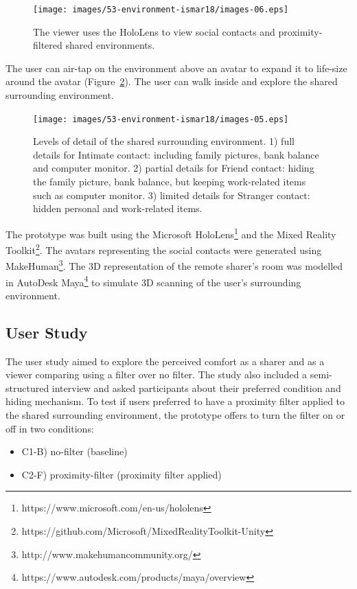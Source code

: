 \begin{figure}
    \centering
    \texttt{[image: images/53-environment-ismar18/images-06.eps]}
    \caption{The viewer uses the HoloLens to view social contacts and proximity-filtered shared environments.}
    \label{fig:environment:setup}
\end{figure}

The user can air-tap on the environment above an avatar to expand it to life-size around the avatar (Figure~\ref{fig:environment:environment-levels}). The user can walk inside and explore the shared surrounding environment.

\begin{figure}
  \centering
  \texttt{[image: images/53-environment-ismar18/images-05.eps]}
  \caption{Levels of detail of the shared surrounding environment. 1) full details for Intimate contact: including family pictures, bank balance and computer monitor. 2) partial details for Friend contact: hiding the family picture, bank balance, but keeping work-related items such as computer monitor. 3) limited details for Stranger contact: hidden personal and work-related items.}
  \label{fig:environment:environment-levels}
\end{figure}

The prototype was built using the Microsoft HoloLens\footnote{https://www.microsoft.com/en-us/hololens} and the Mixed Reality Toolkit\footnote{https://github.com/Microsoft/MixedRealityToolkit-Unity}. The avatars representing the social contacts were generated using MakeHuman\footnote{http://www.makehumancommunity.org/}. The 3D representation of the remote sharer's room was modelled in AutoDesk Maya\footnote{https://www.autodesk.com/products/maya/overview} to simulate 3D scanning of the user's surrounding environment. 

\subsection{User Study}

The user study aimed to explore the perceived comfort as a sharer and as a viewer comparing using a filter over no filter. The study also included a semi-structured interview and asked participants about their preferred condition and hiding mechanism. To test if users preferred to have a proximity filter applied to the shared surrounding environment, the prototype offers to turn the filter on or off in two conditions: 

\begin{itemize}
    \item C1-B) no-filter (baseline)
    \item C2-F) proximity-filter (proximity filter applied)
\end{itemize}

